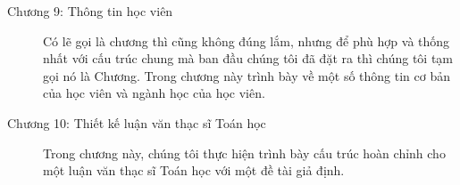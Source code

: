 \begin{description}
\item [Chương 9: Thông tin học viên] Có lẽ gọi là chương thì cũng không đúng lắm, nhưng để phù hợp và thống nhất với cấu trúc chung mà ban đầu chúng tôi đã đặt ra thì chúng tôi tạm gọi nó là Chương. Trong chương này trình bày về một số thông tin cơ bản của học viên và ngành học của học viên.
\item [Chương 10: Thiết kế luận văn thạc sĩ Toán học] Trong chương này, chúng tôi thực hiện trình bày cấu trúc hoàn chỉnh cho một luận văn thạc sĩ Toán học với một đề tài giả định.
\end{description}
